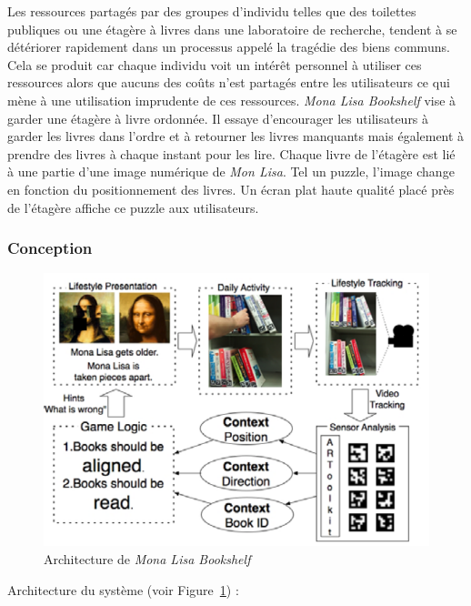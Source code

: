 \documentclass[10pt,a5paper,twoside]{article}
\begin{document}
Les ressources partagés par des groupes d'individu telles que des
toilettes publiques ou une étagère à livres dans une laboratoire de
recherche, tendent à se détériorer rapidement dans un processus appelé
la tragédie des biens communs. Cela se produit car chaque individu voit
un intérêt personnel à utiliser ces ressources alors que aucuns des
coûts n'est partagés entre les utilisateurs ce qui mène à une
utilisation imprudente de ces ressources. \emph{Mona Lisa Bookshelf}
vise à garder une étagère à livre ordonnée. Il essaye d'encourager les
utilisateurs à garder les livres dans l'ordre et à retourner les livres
manquants mais également à prendre des livres à chaque instant pour les
lire. Chaque livre de l'étagère est lié à une partie d'une image
numérique de \emph{Mon Lisa}. Tel un puzzle, l'image change en fonction
du positionnement des livres. Un écran plat haute qualité placé près de
l'étagère affiche ce puzzle aux utilisateurs.

\subsubsection{Conception}\label{conception-1}

\begin{figure}
\centering
\includegraphics[width=0.900\hsize]{images/monalisa-screenshot1.png}
\caption{Architecture de \emph{Mona Lisa
Bookshelf}}\label{fig:monalisa1}
\end{figure}

Architecture du système (voir Figure~\ref{fig:monalisa1}) :
\end{document}

